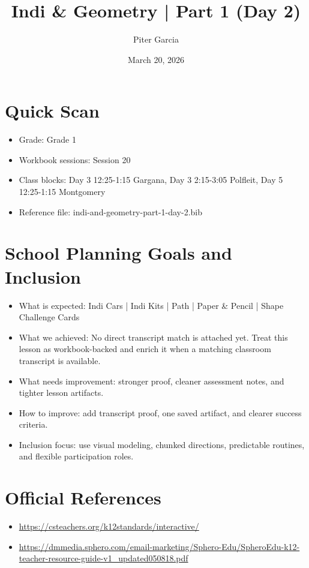\documentclass[11pt]{article}
\title{Indi & Geometry | Part 1 (Day 2)}
\author{Piter Garcia}
\date{March 20, 2026}
\begin{document}
    \maketitle
    \section*{Quick Scan}
    \begin{itemize}[leftmargin=*]
    \item Grade: Grade 1
    \item Workbook sessions: Session 20
    \item Class blocks: Day 3 12:25-1:15 Gargana, Day 3 2:15-3:05 Polfleit, Day 5 12:25-1:15 Montgomery
    \item Reference file: indi-and-geometry-part-1-day-2.bib
    \end{itemize}
    \section*{School Planning Goals and Inclusion}
    \begin{itemize}[leftmargin=*]
    \item What is expected: Indi Cars | Indi Kits | Path | Paper & Pencil | Shape Challenge Cards
    \item What we achieved: No direct transcript match is attached yet. Treat this lesson as workbook-backed and enrich it when a matching classroom transcript is available.
    \item What needs improvement: stronger proof, cleaner assessment notes, and tighter lesson artifacts.
    \item How to improve: add transcript proof, one saved artifact, and clearer success criteria.
    \item Inclusion focus: use visual modeling, chunked directions, predictable routines, and flexible participation roles.
    \end{itemize}
    \section*{Official References}
    \begin{itemize}[leftmargin=*]
    \item \url{https://csteachers.org/k12standards/interactive/}
\item \url{https://dmmedia.sphero.com/email-marketing/Sphero-Edu/SpheroEdu-k12-teacher-resource-guide-v1_updated050818.pdf}

    \end{itemize}
    
\end{document}
